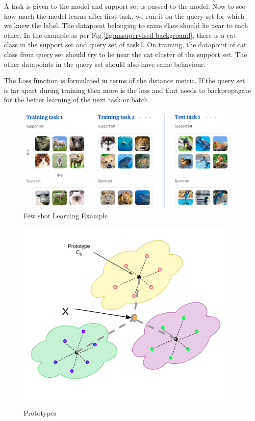     A task is given to the model and support set is passed to the model. Now to see how much the model learns after first task, we run it on the query set for which we knew the label. The datapoint belonging to same class should lie near to each other. In the example as per Fig.\ref{fig:unsupervised-background}, there is a cat class in the support set and query set of task1. On training, the datapoint of cat class from query set should try to lie near the cat cluster of the support set. The other datapoints in the query set should also have same behaviour.
	
	The Loss function is formulated in terms of the distance metric. If the query set is far apart during training then more is the loss and that needs to backpropagate for the better learning of the next task or batch.

\begin{figure}[t]
    \centering
    \includegraphics[scale=0.4]{figures/chapter-3/unsupervised_few_shot.png}
    \caption{Few shot Learning Example}
     \label{fig:unsupervised-fewshot}
\end{figure}


\begin{figure}[t]
    \centering
    \includegraphics[scale=0.5]{figures/chapter-3/prototypes.png}
    \caption{Prototypes}
     \label{fig:unsupervised-prototypes}
\end{figure}

